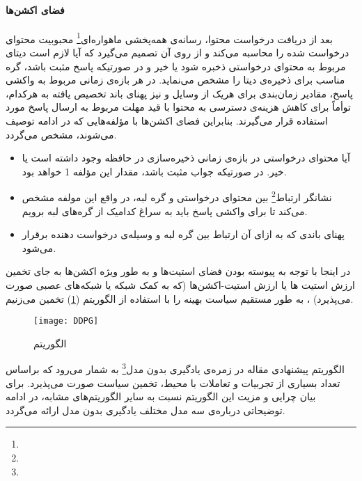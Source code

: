 \paragraph{فضای اکشن‌ها}
بعد از دریافت درخواست محتوا، رسانه‌ی همه‌پخشی ماهواره‌ای\footnote{} محبوبیت محتوای درخواست شده را محاسبه می‌کند و از روی آن تصمیم می‌گیرد که‌ آیا لازم است دیتای مربوط به محتوای درخواستی ذخبره شود یا خیر و در صورتیکه پاسخ مثبت باشد،‌ گره مناسب برای ذخیره‌ی دیتا را مشخص می‌نماید. در هر بازه‌ی زمانی مربوط به واکشی پاسخ، مقادیر زمان‌بندی برای هریک از وسایل و نیز پهنای باند تخصیص یافته به هرکدام، توأماً برای کاهش هزینه‌ی دسترسی به محتوا با قید مهلت مربوط به ارسال پاسخ مورد استفاده قرار می‌گیرند. بنابراین فضای اکشن‌ها با مؤلفه‌هایی که در ادامه توصیف می‌شوند، مشخص می‌گردد.
\begin{itemize}
	\item 
	آیا محتوای درخواستی در بازه‌ی زمانی ذخیره‌سازی در حافظه وجود داشته است یا خیر. در صورتیکه جواب مثبت باشد، مقدار این مؤلفه 1 خواهد بود.  
	\item 
	نشانگر ارتباط\footnote{} بین محتوای درخواستی و گره لبه، در واقع این مولفه مشخص می‌کند تا برای واکشی پاسخ باید به سراغ کدامیک از گره‌های لبه برویم.
	\item
	پهنای باندی که به ازای آن ارتباط بین گره لبه و وسیله‌ی درخواست دهنده برقرار می‌شود.
\end{itemize}
 
 در اینجا با توجه به پیوسته بودن فضای استیت‌ها و به طور ویژه اکشن‌ها به جای تخمین ارزش استیت ها یا ارزش استیت‌-اکشن‌ها (که به کمک شبکه یا شبکه‌ها‌ی عصبی صورت می‌پذیرد) ، به طور مستقیم سیاست بهینه را با استفاده از الگوریتم (\ref{fig:DDPG}) تخمین می‌زنیم.
 \begin{figure}[ht]
 	\centerline{\texttt{[image: DDPG]}}
 	\caption{الگوریتم }
 	\label{fig:DDPG}
 \end{figure}

الگوریتم پیشنهادی مقاله در زمره‌ی یادگیری بدون مدل\footnote{} به‌ شمار می‌رود که براساس تعداد بسیاری از تجربیات و تعاملات با محیط، تخمین سیاست صورت می‌پذیرد. برای بیان چرایی و مزیت این الگوریتم نسبت به سایر الگوریتم‌های مشابه، در ادامه توضیحاتی درباره‌ی سه مدل مختلف یادگیری بدون مدل ارائه می‌گردد. 

